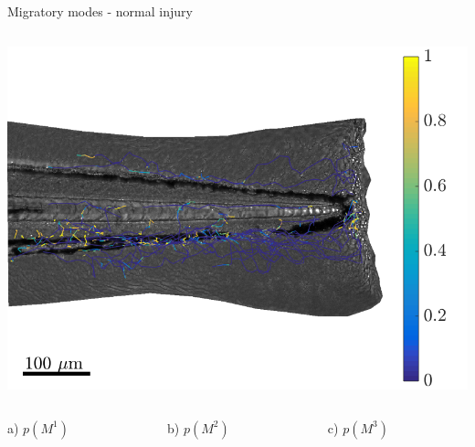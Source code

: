 \documentclass[mathserif,11pt]{beamer}
\begin{document}
\begin{frame}{Migratory modes - normal injury}
\begin{columns}
\begin{column}{0.31\textwidth}
		\vspace{0.2cm}
		\includegraphics[scale=0.19]{Figures/mode3_fish3.png}
	\end{column}
\end{columns}
\begin{columns}
	\centering
	\begin{column}{0.31\textwidth}
		\centering
		\footnotesize{ a) $p(M^1)$}
	\end{column}
	\begin{column}{0.31\textwidth}
		\centering
		\footnotesize{ b)  $p(M^2)$}
	\end{column}
	\begin{column}{0.31\textwidth}
		\centering
		\footnotesize{ c)  $p(M^3)$}
	\end{column}
\end{columns}
\end{frame}
\end{document}
